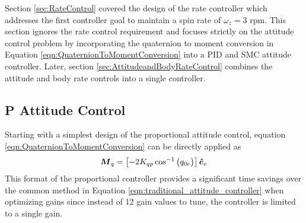 Section \ref{sec:RateControl} covered the design of the rate controller which addresses the first controller goal to maintain a spin rate of $\omega_z = 3$ rpm.  This section ignores the rate control requirement and focuses strictly on the attitude control problem by incorporating the quaternion to moment conversion in Equation \ref{eqn:QuaternionToMomentConversion} into a PID and SMC attitude controller.   Later, section \ref{sec:AttitudeandBodyRateControl} combines the attitude and body rate controls into a single controller.

\subsection{P Attitude Control}
\label{subsec:PAttitudeControl}

Starting with a simplest design of the proportional attitude control, equation \ref{eqn:QuaternionToMomentConversion} can be directly applied as
\begin{equation}
  \boldsymbol{M}_{q} = \left[-2 K_{qp} \cos^{-1} \big(q_{0e} \big) \right] \boldsymbol{\hat{e}}_e \\
  \label{eqn:PAttitudeControl}
\end{equation}
This format of the proportional controller provides a significant time savings over the common method in Equation \ref{eqn:traditional_attitude_controller} when optimizing gains since instead of 12 gain values to tune, the controller is limited to a single gain.

